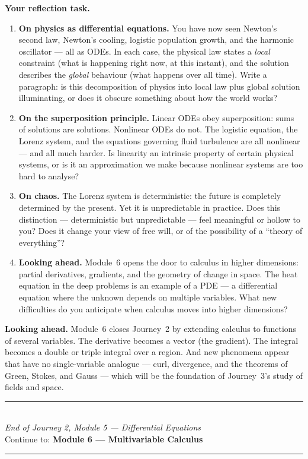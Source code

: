 \documentclass[12pt, a4paper]{article}
\newcounter{problem}
\begin{document}
\begin{reflectionbox}
\textbf{Your reflection task.}

\begin{enumerate}
  \item \textbf{On physics as differential equations.} You have now seen Newton's second law, Newton's cooling, logistic population growth, and the harmonic oscillator --- all as ODEs. In each case, the physical law states a \emph{local} constraint (what is happening right now, at this instant), and the solution describes the \emph{global} behaviour (what happens over all time). Write a paragraph: is this decomposition of physics into local law plus global solution illuminating, or does it obscure something about how the world works?

  \item \textbf{On the superposition principle.} Linear ODEs obey superposition: sums of solutions are solutions. Nonlinear ODEs do not. The logistic equation, the Lorenz system, and the equations governing fluid turbulence are all nonlinear --- and all much harder. Is linearity an intrinsic property of certain physical systems, or is it an approximation we make because nonlinear systems are too hard to analyse?

  \item \textbf{On chaos.} The Lorenz system is deterministic: the future is completely determined by the present. Yet it is unpredictable in practice. Does this distinction --- deterministic but unpredictable --- feel meaningful or hollow to you? Does it change your view of free will, or of the possibility of a ``theory of everything''?

  \item \textbf{Looking ahead.} Module~6 opens the door to calculus in higher dimensions: partial derivatives, gradients, and the geometry of change in space. The heat equation in the deep problems is an example of a PDE --- a differential equation where the unknown depends on multiple variables. What new difficulties do you anticipate when calculus moves into higher dimensions?
\end{enumerate}
\end{reflectionbox}

\medskip
\noindent\textbf{Looking ahead.}
Module~6 closes Journey~2 by extending calculus to functions of several variables. The derivative becomes a vector (the gradient). The integral becomes a double or triple integral over a region. And new phenomena appear that have no single-variable analogue --- curl, divergence, and the theorems of Green, Stokes, and Gauss --- which will be the foundation of Journey~3's study of fields and space.

\vspace{1.4cm}
\begin{center}
{\color{MidBlue}\rule{0.5\linewidth}{0.8pt}}\\[6pt]
{\small\color{DarkGrey}\textit{End of Journey 2, Module 5 --- Differential Equations}}\\[4pt]
{\small\color{DarkGrey}Continue to: \textbf{Module 6 --- Multivariable Calculus}}\\[6pt]
{\color{MidBlue}\rule{0.5\linewidth}{0.8pt}}
\end{center}
\end{document}
